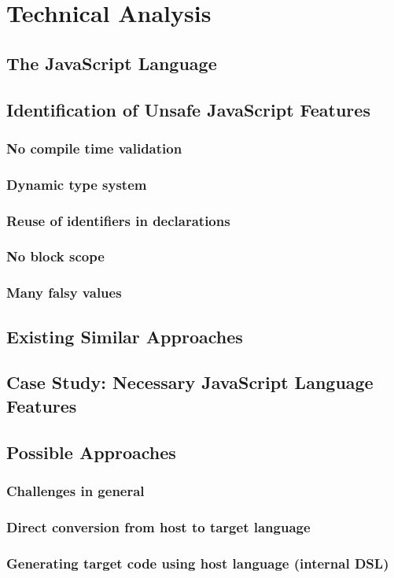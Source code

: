 \chapter{Technical Analysis}

\section{The JavaScript Language}

\section{Identification of Unsafe JavaScript Features}
	\subsection{No compile time validation}
	\subsection{Dynamic type system}
	\subsection{Reuse of identifiers in declarations}
	\subsection{No block scope}
	\subsection{Many falsy values}

\section{Existing Similar Approaches}

\section{Case Study: Necessary JavaScript Language Features}

\section{Possible Approaches}
	\subsection{Challenges in general}
	\subsection{Direct conversion from host to target language}
	\subsection{Generating target code using host language (internal DSL)}
